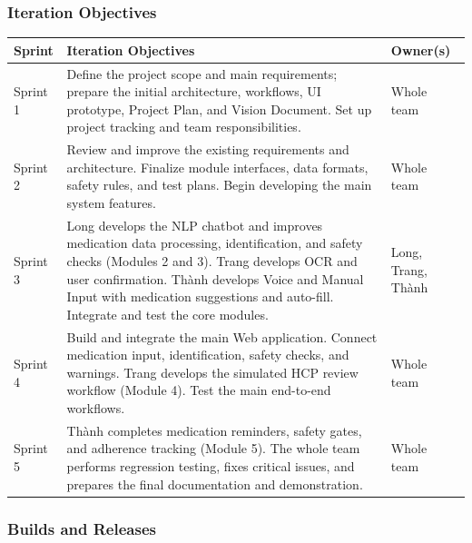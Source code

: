 \subsubsection{Iteration Objectives}

\begin{longtable}{|L{0.12\textwidth}|L{0.58\textwidth}|L{0.20\textwidth}|}
\hline
\textbf{Sprint} & \textbf{Iteration Objectives}
& \textbf{Owner(s)}\\ \hline

Sprint 1
& Define the project scope and main requirements;
prepare the initial architecture, workflows,
UI prototype, Project Plan, and Vision Document.
Set up project tracking and team responsibilities.
& Whole team\\ \hline

Sprint 2
& Review and improve the existing requirements
and architecture. Finalize module interfaces,
data formats, safety rules, and test plans.
Begin developing the main system features.
& Whole team\\ \hline

Sprint 3
& Long develops the NLP chatbot and improves
medication data processing, identification,
and safety checks (Modules 2 and 3).
Trang develops OCR and user confirmation.
Thành develops Voice and Manual Input with
medication suggestions and auto-fill.
Integrate and test the core modules.
& Long, Trang, Thành\\ \hline

Sprint 4
& Build and integrate the main Web application.
Connect medication input, identification,
safety checks, and warnings.
Trang develops the simulated HCP review
workflow (Module 4). Test the main
end-to-end workflows.
& Whole team\\ \hline

Sprint 5
& Thành completes medication reminders,
safety gates, and adherence tracking
(Module 5). The whole team performs
regression testing, fixes critical issues,
and prepares the final documentation
and demonstration.
& Whole team\\ \hline

\end{longtable}


\subsubsection{Builds and Releases}

